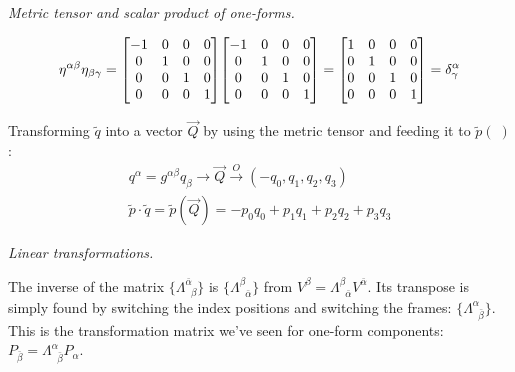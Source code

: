 \documentclass{report}
\begin{document}
\begin{subquests}
	\item \emph{Metric tensor and scalar product of one-forms.}
	\begin{subquests}
		\item
		\begin{gather*}
			\eta^{\alpha\beta}\eta_{\beta\gamma} =
			\mqty[
				-1 & 0 & 0 & 0 \\
				0 & 1 & 0 & 0 \\
				0 & 0 & 1 & 0 \\
				0 & 0 & 0 & 1 
			]
			\mqty[
				-1 & 0 & 0 & 0 \\
				0 & 1 & 0 & 0 \\
				0 & 0 & 1 & 0 \\
				0 & 0 & 0 & 1
			]
			= 
			\mqty[
				1 & 0 & 0 & 0 \\
				0 & 1 & 0 & 0 \\
				0 & 0 & 1 & 0 \\
				0 & 0 & 0 & 1
			] = \delta^{\alpha}_{\gamma}
		\end{gather*}
		

		\item 	
		Transforming $\tilde q$ into a vector $\vec Q$ by using the metric tensor and feeding it to $\tilde p(\;)$:
		\begin{gather*}
			q^{\alpha} = g^{\alpha\beta}q_{\beta} \longrightarrow \vec Q \stackrel{O}\longrightarrow (-q_0, q_1, q_2, q_3) \\
			\tilde p \cdot \tilde q = \tilde p(\vec Q) = -p_0 q_0 + p_1 q_1 + p_2 q_2 + p_3 q_3
		\end{gather*}
	\end{subquests}

	\item \emph{Linear transformations.}
	\begin{subquests}
		\item
		The inverse of the matrix $\{\Lambda^{\bar \alpha}_{\;\;\beta}\}$ is $\{\Lambda^{\beta}_{\;\;\bar\alpha}\}$ from $V^{\beta} = \Lambda^{\beta}_{\;\;\bar\alpha}V^{\bar\alpha}$. Its transpose is simply found by switching the index positions and switching the frames: $\{\Lambda^{\alpha}_{\;\;\bar\beta}\}$. This is the transformation matrix we've seen for one-form components: $P_{\bar\beta} = \Lambda^{\alpha}_{\;\;\bar\beta}P_{\alpha}$.

		\item
	\end{subquests}


\end{subquests}
\end{document}
